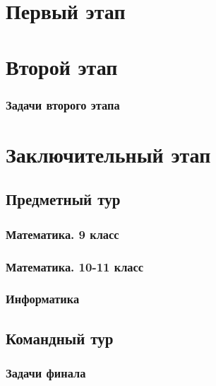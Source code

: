 \documentclass[a4paper,12pt,oneside]{book}
\begin{document}

\setcounter{tocdepth}{1}

\tableofcontents

\part{Первый этап}




\part{Второй этап}
\clearpage
\section{Задачи второго этапа}



\part{Заключительный этап}

\clearpage
\chapter{Предметный тур}

\section{Математика. 9 класс}


\section{Математика. 10-11 класс}


\section{Информатика}


\chapter{Командный тур}

\section{Задачи финала}

\end{document}
